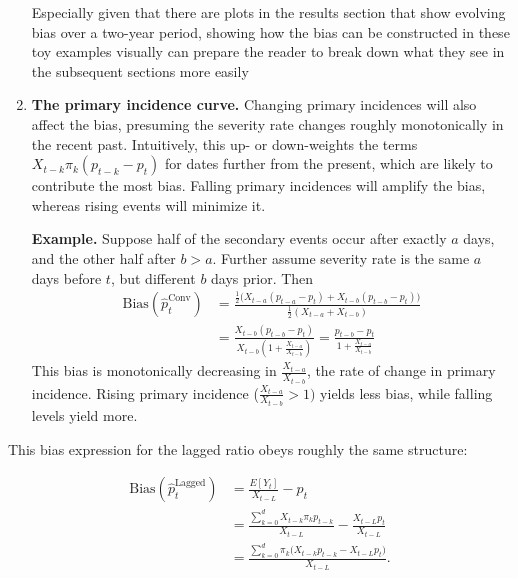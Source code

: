 \documentclass{article}
\begin{document}
\begin{enumerate}
{    Especially given that there are plots in the results section that show
    evolving bias over a two-year period, showing how the
    bias can be constructed in these toy examples visually can
    prepare the reader to break down what they see in the
    subsequent sections more easily
}

\item \textbf{The primary incidence curve.} Changing primary incidences will also affect the bias, presuming the severity rate changes roughly monotonically in the recent past. Intuitively, this up- or down-weights the terms $X_{t-k}\pi_k(p_{t-k} - p_t)$ for dates further from the present, which are likely to contribute the most bias. Falling primary incidences will amplify the bias, whereas rising events will minimize it. 

\textbf{Example.} Suppose half of the secondary events occur after exactly $a$ days, and the other half after $b>a$. Further assume severity rate is the same $a$ days before $t$, but different $b$ days prior. Then%
\begin{align*}
    \text{Bias}(\hat{p}_t^{\text{Conv}}) &= \frac{\frac{1}{2}\big(X_{t-a}(p_{t-a}-p_t) + X_{t-b}(p_{t-b}-p_t)\big)}{\frac{1}{2}(X_{t-a}+X_{t-b})} \\
    &=\frac{X_{t-b}(p_{t-b}-p_t)}{X_{t-b}(1+\frac{X_{t-a}}{X_{t-b}})} = \frac{p_{t-b}-p_t}{1+\frac{X_{t-a}}{X_{t-b}}}
\end{align*}
This bias is monotonically decreasing in $\frac{X_{t-a}}{X_{t-b}}$, the rate of change in primary incidence. Rising primary incidence ($\frac{X_{t-a}}{X_{t-b}}>1)$ yields less bias, while falling levels yield more.
\end{enumerate}


This bias expression for the lagged ratio obeys roughly the same structure:

\begin{align}\label{eq:LagBias}
    \text{Bias}(\hat{p}_t^\text{Lagged}) &= \frac{E[Y_t]}{X_{t-L}} - p_t \nonumber\\ 
    &= \frac{\sum_{k=0}^d X_{t-k}\pi_k p_{t-k}}{X_{t-L}} - \frac{X_{t-L} p_t}{X_{t-L}} \nonumber\\
    &= \frac{\sum_{k=0}^d \pi_k\Big( X_{t-k} p_{t-k}-X_{t-L} p_t\Big)}{X_{t-L}}.
\end{align}
\end{document}
